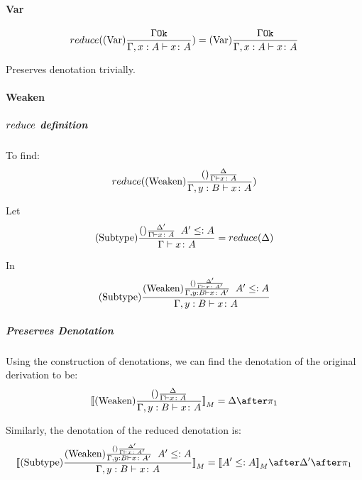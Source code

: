 {            \paragraph{Var}
            \begin{equation}
                reduce((\text{Var}) \frac{\Gamma \texttt{Ok}}{\Gamma, x: A \vdash x \colon A}) =  (\text{Var}) \frac{\Gamma \texttt{Ok}}{\Gamma, x: A \vdash x \colon A}
            \end{equation}

            Preserves denotation trivially.

            \paragraph{Weaken}
            \subparagraph{$reduce$ definition}
            To find:
            \begin{equation}
                reduce((\text{Weaken}) \frac{(\text{}) \frac{\Delta}{\Gamma \vdash x \colon A}}{\Gamma, y: B \vdash x \colon A})
            \end{equation}

            Let 
            \begin{equation}\label{WeakenDeltaReduction}
                (\text{Subtype}) \frac{(\text{}) \frac{\Delta'}{\Gamma \vdash x \colon A}\;\; A'\leq: A}{\Gamma \vdash x \colon A} = reduce(\Delta)
            \end{equation}

            In 
            \begin{equation}
                (\text{Subtype}) \frac{
                (\text{Weaken}) \frac{
                    (\text{}) \frac{\Delta'}{\Gamma \vdash x \colon A'}
                }{
                    \Gamma, y: B \vdash x \colon A'
                }
                \;\;
                A' \leq: A
                }{\Gamma, y: B \vdash x \colon A}
            \end{equation}

            \subparagraph{Preserves Denotation}
            Using the construction of denotations, we can find the denotation of the original derivation to be:
            \begin{equation}
                \deno{\treerule{Weaken}{\treerule{}{\D}{\gtyperelation{x}{A}}}{\typerelation{\gby}{x}{A}}} = \D \after \p
            \end{equation}

            Similarly, the denotation of the reduced denotation is:
            \begin{equation}
                \deno{\treerule{Subtype}{
                    \treerule{Weaken}{
                        \treerule{}{\D'}{\gtyperelation{x}{A'}}
                    } {
                        \typerelation{\gby}{x}{A'}
                    }
                    \s\s
                    A' \subtype A
                    }{\typerelation{\gby}{x}{A}}} = \deno{A'\subtype A}\after \D' \after \p
            \end{equation}


}
